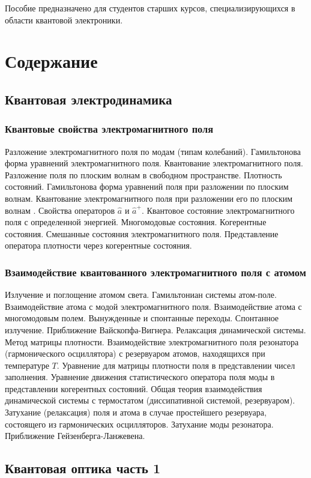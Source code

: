 Пособие предназначено для студентов старших курсов, специализирующихся
в области квантовой электроники. 

\section{Содержание}
\subsection{Квантовая электродинамика}
\subsubsection{Квантовые свойства электромагнитного поля}
Разложение электромагнитного поля по модам (типам колебаний).
Гамильтонова форма уравнений электромагнитного поля.
Квантование электромагнитного поля.
Разложение поля по плоским волнам в свободном пространстве.
Плотность состояний.
Гамильтонова форма уравнений поля при разложении по плоским
волнам.
Квантование электромагнитного поля при разложении его по
плоским волнам .
Свойства операторов $ \hat a $ и $ \hat a ^+ $.
Квантовое состояние электромагнитного поля  с определенной
  энергией.
Многомодовые состояния. 
Когерентные состояния.
Смешанные состояния электромагнитного поля.
Представление оператора плотности через когерентные
состояния.
\subsubsection{Взаимодействие квантованного электромагнитного поля с атомом}
Излучение и поглощение атомом света.
Гамильтониан системы атом-поле.
Взаимодействие атома с модой электромагнитного поля.
Взаимодействие атома с многомодовым полем. Вынужденные и
спонтанные переходы.
Спонтанное излучение. Приближение Вайскопфа-Вигнера.
Релаксация динамической системы. Метод матрицы плотности.
Взаимодействие электромагнитного поля резонатора
(гармонического осциллятора) с резервуаром атомов, находящихся при
температуре $T$.
Уравнение для матрицы плотности поля в представлении чисел
заполнения.
Уравнение движения статистического оператора поля моды в
представлении когерентных состояний.
Общая теория взаимодействия динамической системы с
термостатом (диссипативной системой, резервуаром).
Затухание (релаксация) поля и атома в случае простейшего
резервуара, состоящего из гармонических осцилляторов.
Затухание моды резонатора. Приближение Гейзенберга-Ланжевена.

\subsection{Квантовая оптика часть 1}
